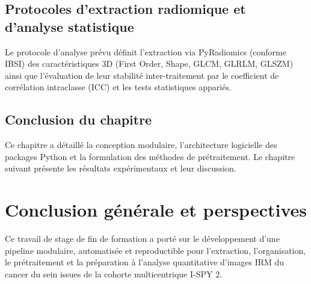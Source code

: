 \documentclass[12pt,a4paper]{report}
\begin{document}
    \section{Protocoles d'extraction radiomique et d'analyse statistique}
    Le protocole d'analyse prévu définit l'extraction via PyRadiomics (conforme IBSI) des caractéristiques 3D (First Order, Shape, GLCM, GLRLM, GLSZM) ainsi que l'évaluation de leur stabilité inter-traitement par le coefficient de corrélation intraclasse (ICC) et les tests statistiques appariés.

    \section*{Conclusion du chapitre}
    Ce chapitre a détaillé la conception modulaire, l'architecture logicielle des packages Python et la formulation des méthodes de prétraitement. Le chapitre suivant présente les résultats expérimentaux et leur discussion.

    

    \clearpage
    \chapter*{Conclusion générale et perspectives}

    Ce travail de stage de fin de formation a porté sur le développement d'une pipeline modulaire, automatisée et reproductible pour l'extraction, l'organisation, le prétraitement et la préparation à l'analyse quantitative d'images IRM du cancer du sein issues de la cohorte multicentrique I-SPY 2.
\end{document}
